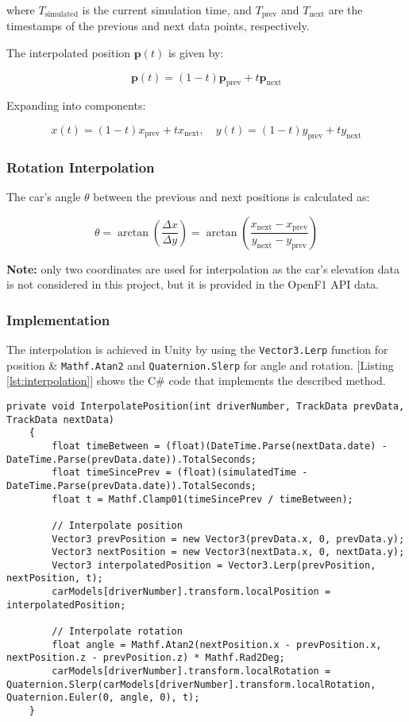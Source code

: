 \documentclass[
	a4paper, %
	10pt, %
	unnumberedsections, %
	twoside, %
]{LTJournalArticle}
\begin{document}
where $T_{\text{simulated}}$ is the current simulation time, and $T_{\text{prev}}$ and $T_{\text{next}}$ are the timestamps of the previous and next data points, respectively.

The interpolated position $\mathbf{p}(t)$ is given by:

\[
\mathbf{p}(t) = (1 - t) \mathbf{p}_{\text{prev}} + t \mathbf{p}_{\text{next}}
\]

Expanding into components:

\[
x(t) = (1 - t) x_{\text{prev}} + t x_{\text{next}}, \quad y(t) = (1 - t) y_{\text{prev}} + t y_{\text{next}}
\]

\subsubsection{Rotation Interpolation}
The car’s angle $\theta$ between the previous and next positions is calculated as:

\[
\theta = \arctan \left( \frac{\Delta x}{\Delta y} \right) = \arctan \left( \frac{x_{\text{next}} - x_{\text{prev}}}{y_{\text{next}} - y_{\text{prev}}} \right)
\]

\textbf{Note:} only two coordinates are used for interpolation as the car's elevation data is not considered in this project, but it is provided in the OpenF1 API data.

\subsubsection{Implementation}

The interpolation is achieved in Unity by using the \verb|Vector3.Lerp| function for position \& \verb|Mathf.Atan2| and \verb|Quaternion.Slerp| for angle and rotation. [Listing \ref{lst:interpolation}] shows the C\# code that implements the described method.

\begin{lstlisting}[caption=Interpolation of Car Position and Rotation, label=lst:interpolation]
    private void InterpolatePosition(int driverNumber, TrackData prevData, TrackData nextData)
    {
        float timeBetween = (float)(DateTime.Parse(nextData.date) - DateTime.Parse(prevData.date)).TotalSeconds;
        float timeSincePrev = (float)(simulatedTime - DateTime.Parse(prevData.date)).TotalSeconds;
        float t = Mathf.Clamp01(timeSincePrev / timeBetween);

        // Interpolate position
        Vector3 prevPosition = new Vector3(prevData.x, 0, prevData.y);
        Vector3 nextPosition = new Vector3(nextData.x, 0, nextData.y);
        Vector3 interpolatedPosition = Vector3.Lerp(prevPosition, nextPosition, t);
        carModels[driverNumber].transform.localPosition = interpolatedPosition;

        // Interpolate rotation
        float angle = Mathf.Atan2(nextPosition.x - prevPosition.x, nextPosition.z - prevPosition.z) * Mathf.Rad2Deg;
        carModels[driverNumber].transform.localRotation = Quaternion.Slerp(carModels[driverNumber].transform.localRotation, Quaternion.Euler(0, angle, 0), t);
    }
\end{lstlisting}
\end{document}
